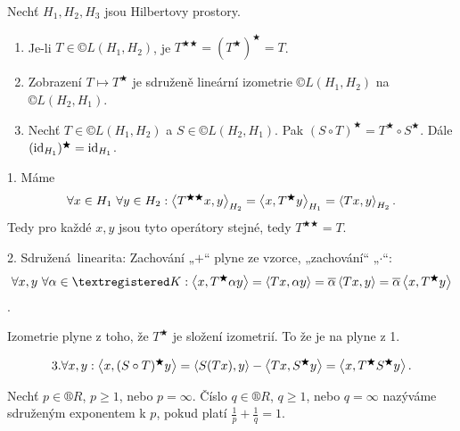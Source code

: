 \documentclass[12pt]{article}					%
\begin{document}
\begin{veta}
	Nechť $H_1, H_2, H_3$ jsou Hilbertovy prostory.
	
	\begin{enumerate}
		\item Je-li $T \in ©L(H_1, H_2)$, je $T^{\bigstar\bigstar} = (T^\bigstar)^\bigstar = T$.
		\item Zobrazení $T \mapsto T^\bigstar$ je sdruženě lineární izometrie $©L(H_1, H_2)$ na $©L(H_2, H_1)$.
		\item Nechť $T \in ©L(H_1, H_2)$ a $S \in ©L(H_2, H_1)$. Pak $(S \circ T)^\bigstar = T^\bigstar \circ S^\bigstar$. Dále $(\operatorname{id}_{H_1})^\bigstar = \operatorname{id}_{H_1}$.
	\end{enumerate}

	\begin{dukazin}
		1. Máme
		$$ \forall x \in H_1\ \forall y \in H_2: \left\langle T^{\bigstar\bigstar}x, y\right\rangle_{H_2} = \left\langle x, T^\bigstar y\right\rangle_{H_1} = \left\langle Tx, y\right\rangle_{H_2}. $$
		Tedy pro každé $x, y$ jsou tyto operátory stejné, tedy $T^{\bigstar\bigstar} = T$.

		2. Sdružená linearita: Zachování „$+$“ plyne ze vzorce, „zachování“ „$·$“:
		$$ \forall x, y\ \forall \alpha \in ®K: \<x, T^\bigstar \alpha y\> = \<Tx, \alpha y\> = \overline{\alpha} \<Tx, y\> = \overline{\alpha}\<x, T^\bigstar y\> $$.

		Izometrie plyne z toho, že $T^\bigstar$ je složení izometrií. To že je na plyne z 1.

		$$ 3. \forall x, y: \left\langle x, (S \circ T)^\bigstar y\right\rangle = \left\langle S(Tx), y\right\rangle - \left\langle Tx, S^\bigstar y\right\rangle = \left\langle x, T^\bigstar S^\bigstar y\right\rangle. $$
	\end{dukazin}
\end{veta}

\begin{definice}
	Nechť $p \in ®R$, $p ≥ 1$, nebo $p = ∞$. Číslo $q \in ®R$, $q ≥ 1$, nebo $q = ∞$ nazýváme sdruženým exponentem k $p$, pokud platí $\frac{1}{p} + \frac{1}{q} = 1$.
\end{definice}
\end{document}
